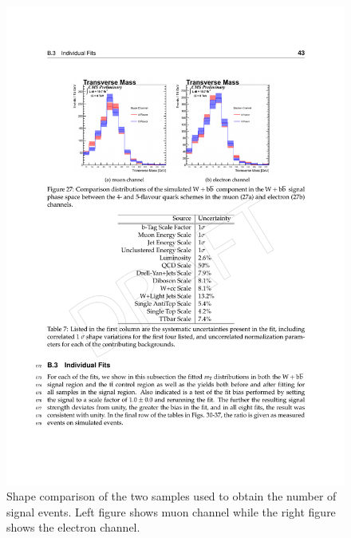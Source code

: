 \begin{figure}[htbp]
	\centering
		\includegraphics[width=\textwidth]{Figures/4fsvs5fs.pdf}
	\caption[Comparison of the two W+bb samples used to obtain the number of signal events.]{Shape comparison of the two samples used to obtain the number of signal events. Left figure shows muon channel while the right figure shows the electron channel.}
	\label{fig:4fsvs5fs}
\end{figure}

